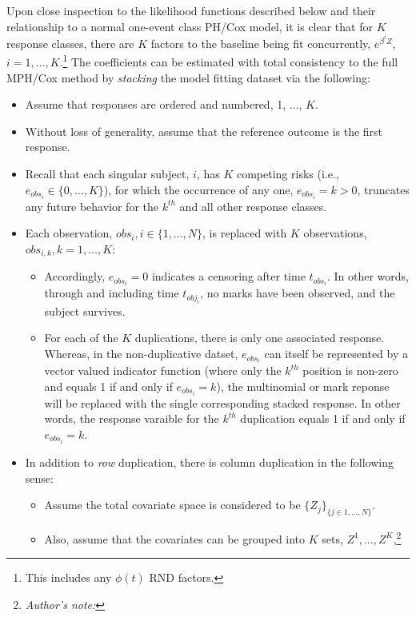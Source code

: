 \documentclass[10pt]{article}
\begin{document}
Upon close inspection to the likelihood functions described below and their relationship to a normal one-event class PH/Cox model,
it is clear that for $K$ response classes, there are $K$ factors to the baseline being fit concurrently, $e^{\beta^iZ}$, $i = 1, \ldots,
K$.\footnote{This includes any $\phi(t)$ RND factors.}  The coefficients can be estimated with total consistency to the full MPH/Cox method by {\em stacking} the
model fitting dataset via the following:
\begin{itemize}
    \item Assume that responses are ordered and numbered, 1, $\dots$, $K$.
    \item Without loss of generality, assume that the reference outcome is the first response.
    \item Recall that each singular subject, $i$, has $K$ competing risks (i.e., $e_{obs_i} \in \{0, \ldots, K\}$), 
                for which the occurrence of any one, $e_{obs_i}=k>0$, truncates
                any future behavior for the $k^{th}$ and all other response classes.  
    \item Each observation, $obs_i, i \in \{1, \ldots, N\}$, is replaced with $K$ observations, $obs_{i,k}, k=1, \ldots, K$:
        \begin{itemize}
            \item Accordingly, $e_{obs_i}=0$ indicates a censoring after time $t_{obs_i}$. In other words, through and including time 
                $t_{obj_i}$, no marks have been observed, and the subject survives.
            \item For each of the $K$ duplications, there is only one associated response. Whereas, in the non-duplicative
                datset, $e_{obs_i}$ can itself be represented by a vector valued indicator function (where only the $k^{th}$ position is non-zero and equals 1
                if and only if $e_{obs_i}=k$), the multinomial or mark reponse will be replaced with the 
                single corresponding stacked response.  In other words, the response varaible for the $k^{th}$ duplication equals 1 if and only if $e_{obs_i}=k$.
        \end{itemize}
    \item In addition to {\em row} duplication, there is column duplication in the following sense:
        \begin{itemize}
            \item Assume the total covariate space is considered to be $\{Z_j\}_{\{j \in 1, \ldots, N\}}$.
            \item Also, assume that the covariates can be grouped into $K$ sets, $Z^1, \ldots, Z^K$,\footnote{{\em Author's note:} 
}
\end{itemize}
\end{itemize}
\end{document}
